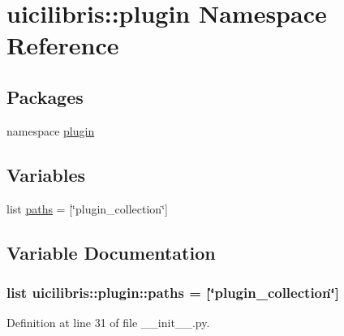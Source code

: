 \hypertarget{namespaceuicilibris_1_1plugin}{\section{uicilibris\-:\-:plugin \-Namespace \-Reference}
\label{namespaceuicilibris_1_1plugin}
}
\subsection*{\-Packages}
\begin{DoxyCompactItemize}
\item 
namespace \hyperlink{namespaceuicilibris_1_1plugin_1_1plugin}{plugin}
\end{DoxyCompactItemize}
\subsection*{\-Variables}
\begin{DoxyCompactItemize}
\item 
list \hyperlink{namespaceuicilibris_1_1plugin_abcdb3936297667918d1e00624d882227}{paths} = \mbox{[}\char`\"{}plugin\-\_\-collection\char`\"{}\mbox{]}
\end{DoxyCompactItemize}


\subsection{\-Variable \-Documentation}
\hypertarget{namespaceuicilibris_1_1plugin_abcdb3936297667918d1e00624d882227}{
\subsubsection[{paths}]{\setlength{\rightskip}{0pt plus 5cm}list {\bf uicilibris\-::plugin\-::paths} = \mbox{[}\char`\"{}plugin\-\_\-collection\char`\"{}\mbox{]}}}\label{namespaceuicilibris_1_1plugin_abcdb3936297667918d1e00624d882227}


\-Definition at line 31 of file \-\_\-\-\_\-init\-\_\-\-\_\-.\-py.

